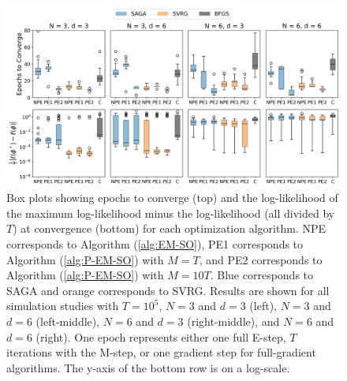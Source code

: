 %
\begin{figure}
    \centering
    \includegraphics[width=6.5in]{../plt/boxplots_sim_T_100000.png}
    \caption{Box plots showing epochs to converge (top) and the log-likelihood of the maximum log-likelihood minus the log-likelihood (all divided by $T$) at convergence (bottom) for each optimization algorithm. NPE corresponds to Algorithm (\ref{alg:EM-SO}), PE1 corresponds to Algorithm (\ref{alg:P-EM-SO}) with $M=T$, and PE2 corresponds to Algorithm (\ref{alg:P-EM-SO}) with $M=10T$. Blue corresponds to SAGA and orange corresponds to SVRG. Results are shown for all simulation studies with $T=10^{5}$, $N=3$ and $d=3$ (left), $N=3$ and $d=6$ (left-middle), $N=6$ and $d=3$ (right-middle), and $N=6$ and $d=6$ (right). One epoch represents either one full E-step, $T$ iterations with the M-step, or one gradient step for full-gradient algorithms. The y-axis of the bottom row is on a log-scale.}
    \label{fig:boxplots_sim}
\end{figure}
%
